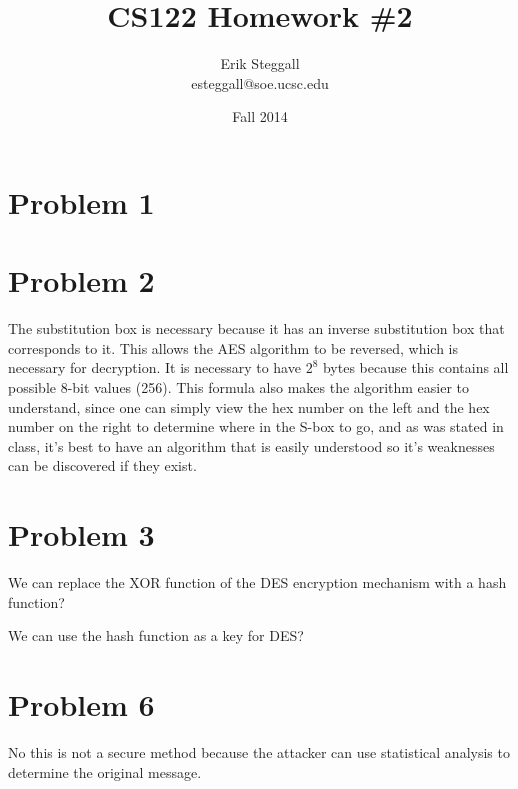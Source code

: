 \documentclass{article}
\title{CS122 Homework \#2}
\author{Erik Steggall \\ esteggall@soe.ucsc.edu}
\date{Fall 2014}
\begin{document}
 \maketitle \pagestyle{empty}
\section*{Problem 1}

\section*{Problem 2}
The substitution box is necessary because it has an inverse substitution box that corresponds to it. This allows the AES algorithm to be reversed, which is necessary for decryption. It is necessary to have $2^8$ bytes because this contains all possible 8-bit values (256). This formula also makes the algorithm easier to understand, since one can simply view the hex number on the left and the hex number on the right to determine where in the S-box to go, and as was stated in class, it's best to have an algorithm that is easily understood so it's weaknesses can be discovered if they exist.\\

\section*{Problem 3}
We can replace the XOR function of the DES encryption mechanism with a hash function? 

We can use the hash function as a key for DES?


\section*{Problem 6}
No this is not a secure method because the attacker can use statistical analysis to determine the original message.\\
\end{document}
